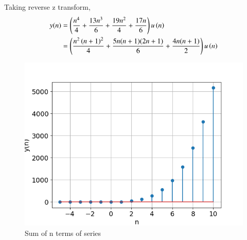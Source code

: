 \documentclass[journal,12pt,twocolumn]{IEEEtran}
\theoremstyle{remark}
\begin{document}
    Taking reverse z transform,\\
    \begin{align}
        y(n) &= \left(\frac{n^4}{4} + \frac{13n^3}{6} + \frac{19n^2}{4} + \frac{17n}{6}\right) u\left(n\right)\\
        &= \left(\frac{n^2\left(n+1\right)^2}{4} + \frac{5n(n+1)(2n+1)}{6} 
        + \frac{4n(n+1)}{2}\right) u\left(n\right)
    \end{align}
    \begin{figure}[!h] 
    \centering
    \includegraphics[width=\columnwidth]{figs/sumplot.png}
    \caption{Sum of n terms of series}
    \label{fig:Graph1_math.11.9.4.8}
    \end{figure}
\end{document}

